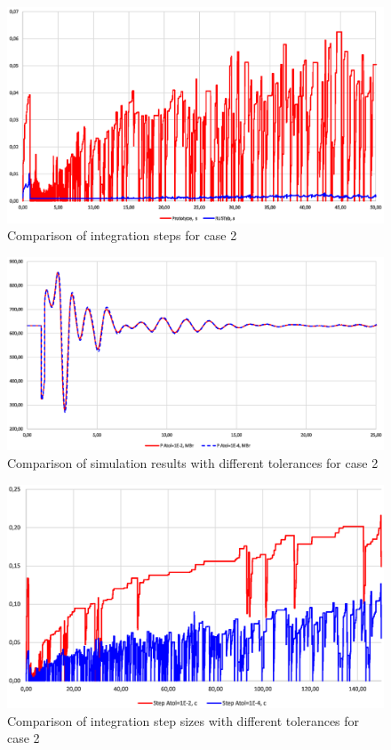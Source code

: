 \documentclass[lettersize,journal]{IEEEtran}
\begin{document}
\begin{figure}[htbp]
	\centering
	\includegraphics[width=\columnwidth]{case2step.eps}
	\caption{Comparison of integration steps for case 2}
	\label{case2step}
\end{figure}


\begin{figure}[htbp]
	\centering
	\includegraphics[width=\columnwidth]{case2atols.eps}
	\caption{Comparison of simulation results with different tolerances for case 2}
	\label{case2atols}
\end{figure}

\begin{figure}[htbp]
	\centering
	\includegraphics[width=\columnwidth]{case2atolsstep.eps}
	\caption{Comparison of integration step sizes with different tolerances for case 2}
	\label{case2atols}
\end{figure}
\end{document}
